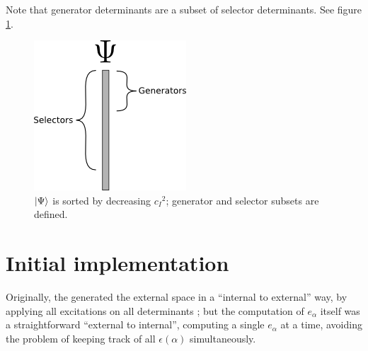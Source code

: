 \documentclass[./thesis.tex]{subfiles}
\begin{document}
Note that generator determinants are a subset of selector determinants. See figure \ref{fig:generators_selectors}.


\begin{figure}[h!]
        
        \begin{center}
                \includegraphics[width=0.4\columnwidth]{figures/cipsi/selexemple2}
        \end{center}
        \caption{$\ket \Psi$ is sorted by decreasing ${c_I}^2$; generator and selector subsets are defined.}
        \label{fig:generators_selectors}
\end{figure}



\section{Initial implementation}

Originally, the \QP generated the external space in a ``internal to external'' way, by applying all excitations on all determinants ; but the computation of $e_\alpha$ itself was a straightforward ``external to internal'', computing a single $e_\alpha$ at a time, avoiding the problem of keeping track of all $\epsilon(\alpha)$ simultaneously.
\end{document}
